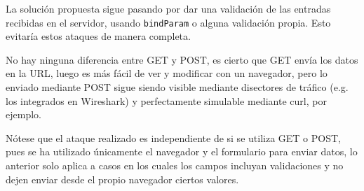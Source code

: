 \documentclass{article}
\begin{document}
La solución propuesta sigue pasando por dar una validación de las entradas recibidas en el servidor, usando \texttt{bindParam} o alguna validación propia. Esto evitaría estos ataques de manera completa.

No hay ninguna diferencia entre GET y POST, es cierto que GET envía los datos en la URL, luego es más fácil de ver y modificar con un navegador, pero lo enviado mediante POST sigue siendo visible mediante disectores de tráfico (e.g. los integrados en Wireshark) y perfectamente simulable mediante curl, por ejemplo. 

Nótese que el ataque realizado es independiente de si se utiliza GET o POST, pues se ha utilizado únicamente el navegador y el formulario para enviar datos, lo anterior solo aplica a casos en los cuales los campos incluyan validaciones y no dejen enviar desde el propio navegador ciertos valores.
\end{document}
